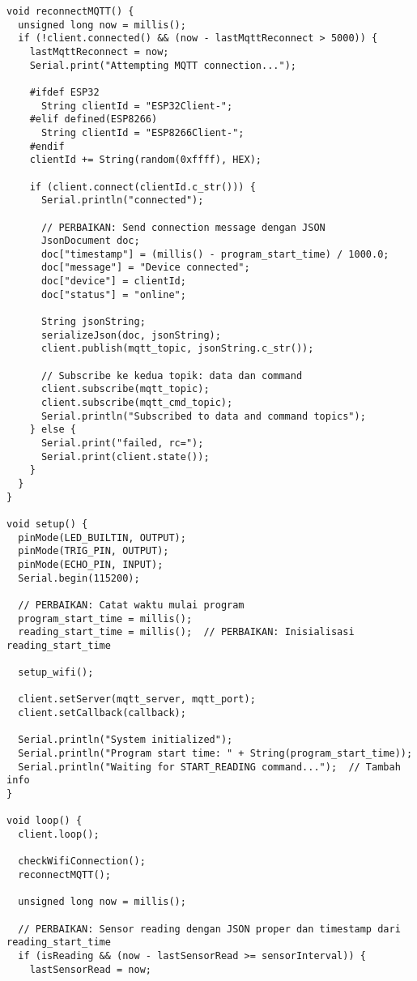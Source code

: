 \begin{itemize}
\begin{scriptsize}
\begin{lstlisting}[language=Arduino]
void reconnectMQTT() {
  unsigned long now = millis();
  if (!client.connected() && (now - lastMqttReconnect > 5000)) {
    lastMqttReconnect = now;
    Serial.print("Attempting MQTT connection...");
    
    #ifdef ESP32
      String clientId = "ESP32Client-";
    #elif defined(ESP8266)
      String clientId = "ESP8266Client-";
    #endif
    clientId += String(random(0xffff), HEX);
    
    if (client.connect(clientId.c_str())) {
      Serial.println("connected");
      
      // PERBAIKAN: Send connection message dengan JSON
      JsonDocument doc;
      doc["timestamp"] = (millis() - program_start_time) / 1000.0;
      doc["message"] = "Device connected";
      doc["device"] = clientId;
      doc["status"] = "online";
      
      String jsonString;
      serializeJson(doc, jsonString);
      client.publish(mqtt_topic, jsonString.c_str());
      
      // Subscribe ke kedua topik: data dan command
      client.subscribe(mqtt_topic);
      client.subscribe(mqtt_cmd_topic);
      Serial.println("Subscribed to data and command topics");
    } else {
      Serial.print("failed, rc=");
      Serial.print(client.state());
    }
  }
}

void setup() {
  pinMode(LED_BUILTIN, OUTPUT);
  pinMode(TRIG_PIN, OUTPUT);
  pinMode(ECHO_PIN, INPUT);
  Serial.begin(115200);
  
  // PERBAIKAN: Catat waktu mulai program
  program_start_time = millis();
  reading_start_time = millis();  // PERBAIKAN: Inisialisasi reading_start_time
  
  setup_wifi();
  
  client.setServer(mqtt_server, mqtt_port);
  client.setCallback(callback);
  
  Serial.println("System initialized");
  Serial.println("Program start time: " + String(program_start_time));
  Serial.println("Waiting for START_READING command...");  // Tambah info
}

void loop() {
  client.loop();
  
  checkWifiConnection();
  reconnectMQTT();
  
  unsigned long now = millis();
  
  // PERBAIKAN: Sensor reading dengan JSON proper dan timestamp dari reading_start_time
  if (isReading && (now - lastSensorRead >= sensorInterval)) {
    lastSensorRead = now;
    

\end{lstlisting}
\end{scriptsize}
\end{itemize}
